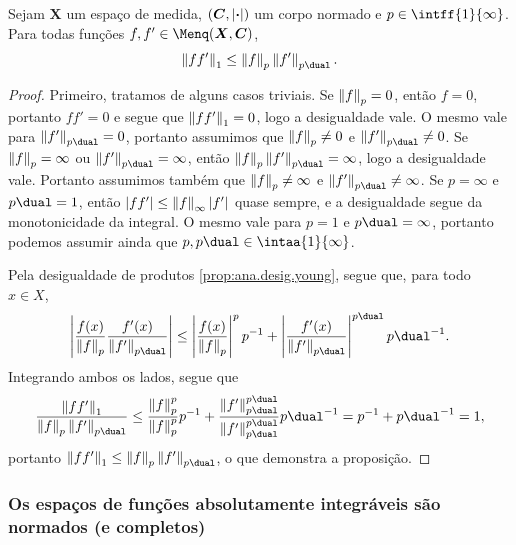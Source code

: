 \begin{prop}
\label{prop:ana.desig.holder}
Sejam $\bm X$ um espaço de medida, $(\bm C,\left\vert{\bm{\cdot}}\right\vert)$ um corpo normado e $p \in \intff{1}{\infty}$. Para todas funções $f,f' \in \Menq(\bm X,\bm C)$,
	\begin{equation*}
	\nor{ff'}_1 \leq \nor{f}_p \nor{f'}_{p\dual}.
	\end{equation*}
\end{prop}
\begin{proof}
Primeiro, tratamos de alguns casos triviais. Se $\left\Vert{f}\right\Vert_p=0$, então $f=0$, portanto $ff'=0$ e segue que $\left\Vert{ff'}\right\Vert_1=0$, logo a desigualdade vale. O mesmo vale para $\nor{f'}_{p\dual}=0$, portanto assumimos que $\left\Vert{f}\right\Vert_p \neq 0$ e $\nor{f'}_{p\dual} \neq 0$. Se $\left\Vert{f}\right\Vert_p=\infty$ ou $\nor{f'}_{p\dual}=\infty$, então $\nor{f}_p \nor{f'}_{p\dual}=\infty$, logo a desigualdade vale. Portanto assumimos também que $\left\Vert{f}\right\Vert_p \neq \infty$ e $\nor{f'}_{p\dual} \neq \infty$. Se $p=\infty$ e ${p\dual}=1$, então $\left\vert{ff'}\right\vert \leq \left\Vert{f}\right\Vert_\infty \left\vert{f'}\right\vert$ quase sempre, e a desigualdade segue da monotonicidade da integral. O mesmo vale para $p=1$ e ${p\dual}=\infty$, portanto podemos assumir ainda que $p,{p\dual} \in \intaa{1}{\infty}$.

Pela desigualdade de produtos \ref{prop:ana.desig.young}, segue que, para todo $x \in X$,
	\begin{equation*}
	\abs{\frac{f(x)}{\nor{f}_p} \frac{f'(x)}{\nor{f'}_{p\dual}}} \leq \abs{\frac{f(x)}{\nor{f}_p}}^p p\inv + \abs{\frac{f'(x)}{\nor{f'}_{p\dual}}}^{p\dual} {p\dual}\inv.
	\end{equation*}
Integrando ambos os lados, segue que
	\begin{equation*}
	\frac{\nor{ff'}_1}{\nor{f}_p \nor{f'}_{p\dual}} \leq \frac{\nor{f}_p^p}{\nor{f}_p^p} p\inv + \frac{\nor{f'}_{p\dual}^{p\dual}}{\nor{f'}_{p\dual}^{p\dual}} {p\dual}\inv = p\inv + {p\dual}\inv = 1,
	\end{equation*}
portanto $\nor{ff'}_1 \leq \nor{f}_p \nor{f'}_{p\dual}$, o que demonstra a proposição.
\end{proof}

\subsubsection{Os espaços de funções absolutamente integráveis são normados (e completos)}

